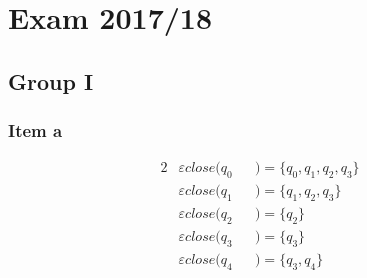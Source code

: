 \documentclass[docid=2017/18]{tcom_exam}
\begin{document}
\setcounter{section}{16}
\section{Exam 2017/18}
{
\renewcommand{\thesubsubsection}{\thesubsection\alph{subsubsection}}
\subsection{Group I}
\subsubsection{Item a}
\begin{alignat*}{2}
	&\varepsilon close(q_0&&)=\{q_0,q_1,q_2,q_3\}\\
	&\varepsilon close(q_1&&)=\{q_1,q_2,q_3\}\\
	&\varepsilon close(q_2&&)=\{q_2\}\\
	&\varepsilon close(q_3&&)=\{q_3\}\\
	&\varepsilon close(q_4&&)=\{q_3,q_4\}
\end{alignat*}
}
\end{document}
